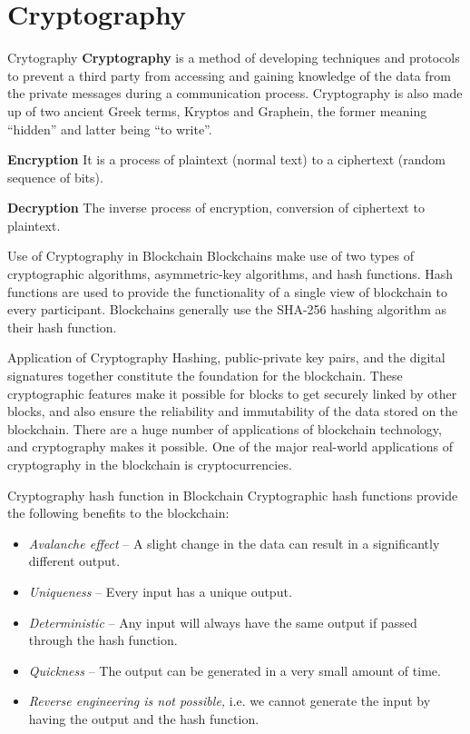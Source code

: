 \documentclass{beamer}
\begin{document}
	\section{Cryptography}
	\begin{frame}{Crytography}
		\textbf{Cryptography} is a method of developing techniques and protocols to prevent a third party from accessing and gaining knowledge of the data from the private messages during a communication process. Cryptography is also made up of two ancient Greek terms, Kryptos and Graphein, the former meaning “hidden” and latter being “to write”. 
		\par \textbf{Encryption} It is a process of plaintext (normal text) to a ciphertext (random sequence of bits).
		\par \textbf{Decryption} The inverse process of encryption, conversion of ciphertext to plaintext.
	\end{frame}

	\begin{frame}{Use of Cryptography in Blockchain}
		\normalsize
		Blockchains make use of two types of cryptographic algorithms, asymmetric-key algorithms, and hash functions. 
Hash functions are used to provide the functionality of a single view of blockchain to every participant. 
Blockchains generally use the SHA-256 hashing algorithm as their hash function. 
	\end{frame}

	\begin{frame}{Application of Cryptography}
		\normalsize
		Hashing, public-private key pairs, and the digital signatures together constitute the foundation for the blockchain. 
These cryptographic features make it possible for blocks to get securely linked by other blocks, and also ensure the reliability and immutability of the data stored on the blockchain.
There are a huge number of applications of blockchain technology, and cryptography makes it possible. One of the major real-world applications of cryptography in the blockchain is cryptocurrencies.
	\end{frame}

	\begin{frame}{Cryptography hash function in Blockchain}
		Cryptographic hash functions provide the following benefits to the blockchain:
	\begin{itemize}
		\item \textit{Avalanche effect} – A slight change in the data can result in a significantly different output.
		\item \textit{Uniqueness} – Every input has a unique output.
		\item \textit{Deterministic} – Any input will always have the same output if passed through the hash function.
		\item \textit{Quickness} – The output can be generated in a very small amount of time.
		\item \textit{Reverse engineering is not possible,} i.e. we cannot generate the input by having the output and the hash function.
	\end{itemize}
	\end{frame}
\end{document}
